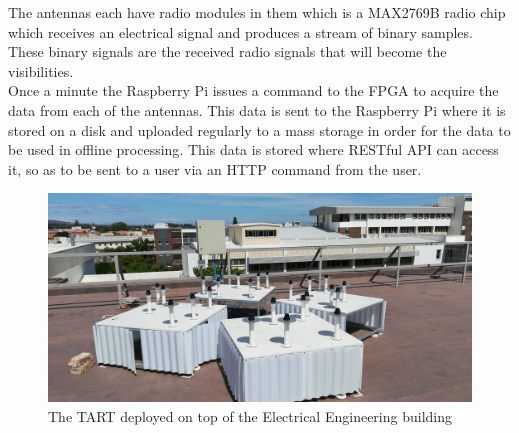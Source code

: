The antennas each have radio modules in them which is a MAX2769B radio chip\cite{RADIO_CHIP} which receives an electrical signal and produces a stream of binary samples\cite{CALIBRATION_AND_SYNTHESIS_TART}. These binary signals are the received radio signals that will become the visibilities.\\
Once a minute the Raspberry Pi issues a command to the FPGA to acquire the data from each of the antennas. This data is sent to the Raspberry Pi where it is stored on a disk and uploaded regularly to a mass storage in order for the data to be used in offline processing\cite{CALIBRATION_AND_SYNTHESIS_TART}. This data is stored where RESTful API can access it, so as to be sent to a user via an HTTP command from the user.
\begin{figure}
    \centering
    \includegraphics[scale=0.08]{images/TART.jpg}
    \caption{The TART deployed on top of the Electrical Engineering building}
    \label{fig:TART}
\end{figure}